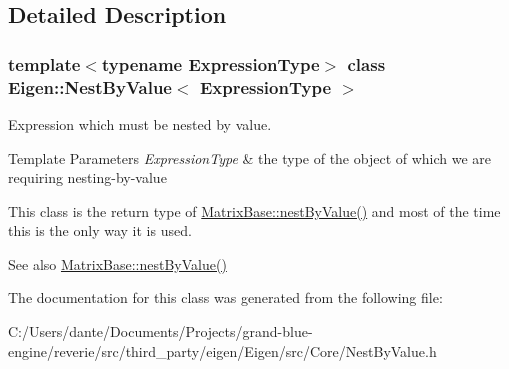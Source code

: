 \subsection{Detailed Description}
\subsubsection*{template$<$typename Expression\+Type$>$\newline
class Eigen\+::\+Nest\+By\+Value$<$ Expression\+Type $>$}

Expression which must be nested by value. 


\begin{DoxyTemplParams}{Template Parameters}
{\em Expression\+Type} & the type of the object of which we are requiring nesting-\/by-\/value\\
\hline
\end{DoxyTemplParams}
This class is the return type of \mbox{\hyperlink{class_eigen_1_1_dense_base_a3e2761e2b6da74dba1d17b40cc918bf7}{Matrix\+Base\+::nest\+By\+Value()}} and most of the time this is the only way it is used.

\begin{DoxySeeAlso}{See also}
\mbox{\hyperlink{class_eigen_1_1_dense_base_a3e2761e2b6da74dba1d17b40cc918bf7}{Matrix\+Base\+::nest\+By\+Value()}} 
\end{DoxySeeAlso}


The documentation for this class was generated from the following file\+:\begin{DoxyCompactItemize}
\item 
C\+:/\+Users/dante/\+Documents/\+Projects/grand-\/blue-\/engine/reverie/src/third\+\_\+party/eigen/\+Eigen/src/\+Core/Nest\+By\+Value.\+h\end{DoxyCompactItemize}
